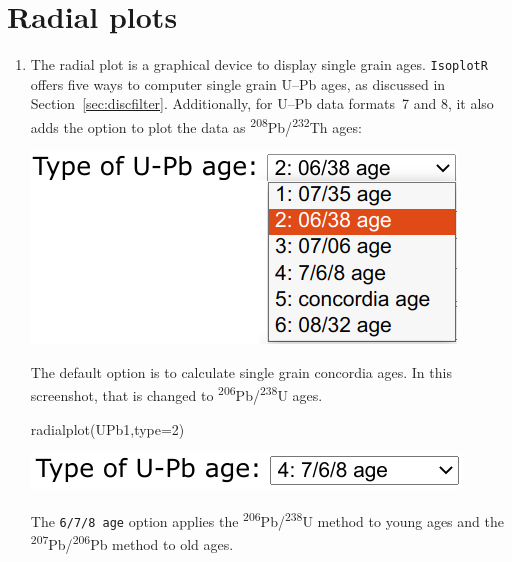 \begin{refsection}
\begin{enumerate}
\end{enumerate}

\section{Radial plots}
\label{sec:UPbRadial}

\begin{enumerate}

\item The radial plot is a graphical device to display single grain
  ages. \texttt{IsoplotR} offers five ways to computer single grain
  U--Pb ages, as discussed in
  Section~\ref{sec:discfilter}. Additionally, for U--Pb data formats~7
  and 8, it also adds the option to plot the data as
  \textsuperscript{208}Pb/\textsuperscript{232}Th ages:

\noindent\begin{minipage}[t]{.35\linewidth}
  \strut\vspace*{-\baselineskip}\newline
  \includegraphics[width=\linewidth]{../figures/UPbRadialAgeTypes.png}
\end{minipage}
\begin{minipage}[t]{.65\linewidth}
  The default option is to calculate single grain concordia ages. In
  this screenshot, that is changed to
  \textsuperscript{206}Pb/\textsuperscript{238}U ages.
\end{minipage}

\begin{console}
radialplot(UPb1,type=2)
\end{console}

\noindent\begin{minipage}[t]{.35\linewidth}
  \strut\vspace*{-\baselineskip}\newline
  \includegraphics[width=\linewidth]{../figures/UPbRadial678age.png}
\end{minipage}
\begin{minipage}[t]{.65\linewidth}
  The \texttt{6/7/8 age} option applies the
  \textsuperscript{206}Pb/\textsuperscript{238}U method to young ages
  and the \textsuperscript{207}Pb/\textsuperscript{206}Pb method to
  old ages.
\end{minipage}


\end{enumerate}
\end{refsection}
